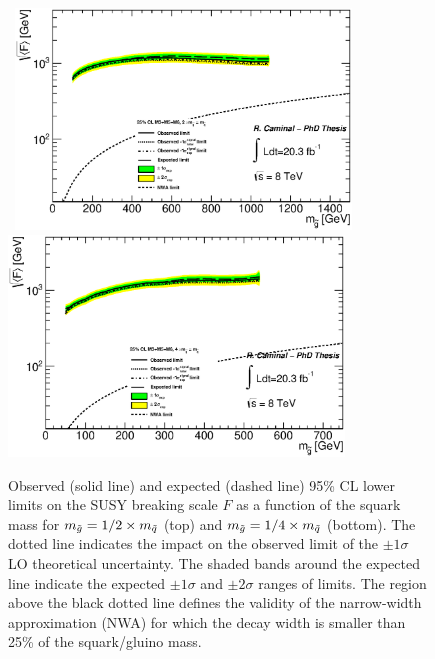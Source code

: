 \begin{figure}[!ht]
\begin{center}
\mbox{
\includegraphics[width=0.795\textwidth]{Interpretations/Figures/ModelIndependentGravitino_combined_sqrtFLimit_Stop_A4_A9_A10mq2mg.eps}
}
\mbox{
\includegraphics[width=0.795\textwidth]{Interpretations/Figures/ModelIndependentGravitino_combined_sqrtFLimit_Stop_A4_A9_A10mq4mg.eps}
}
\end{center}
\caption[95\% CL lower limits on the SUSY breaking scale $F$ as a function of the squark mass for $m_{\gluino} = 1/2 \times m_{\squark}$ and $m_{\gluino} = 1/4 \times m_{\squark}$.]{Observed (solid line) and expected (dashed line) 95\% CL lower limits on the SUSY breaking scale $F$ as a function of the squark mass for $m_{\gluino} = 1/2 \times m_{\squark}$ (top) and $m_{\gluino} = 1/4 \times m_{\squark}$ (bottom). The dotted line indicates the impact on the observed limit of the $\pm1\sigma$ LO theoretical uncertainty. 
  The shaded bands around the expected line indicate the expected $\pm1\sigma$ and $\pm2\sigma$ ranges of limits. 
  The region above the black dotted line defines the validity of the narrow-width approximation (NWA) for which the decay width is smaller than 25\% of the squark/gluino mass.}
\label{fig:GravitinoSqrtFExclusion_mqxmg}
\end{figure}


